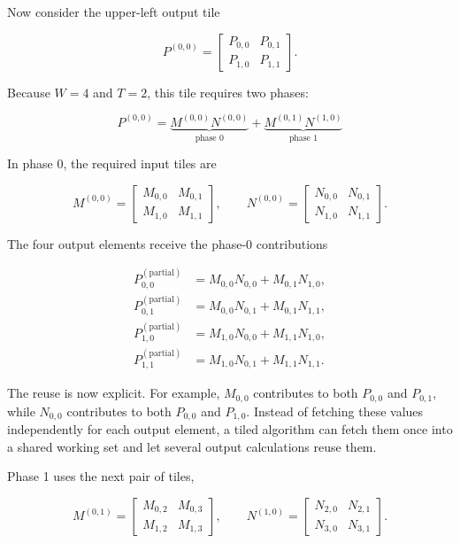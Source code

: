 \documentclass[11pt,a4paper]{article}
\begin{document}
Now consider the upper-left output tile

\[
P^{(0,0)}
=
\begin{bmatrix}
P_{0,0} & P_{0,1} \\
P_{1,0} & P_{1,1}
\end{bmatrix}.
\]

Because $W=4$ and $T=2$, this tile requires two phases:

\[
\boxed{
P^{(0,0)}
=
\underbrace{M^{(0,0)}N^{(0,0)}}_{\text{phase 0}}
+
\underbrace{M^{(0,1)}N^{(1,0)}}_{\text{phase 1}}
}
\]

In phase 0, the required input tiles are

\[
M^{(0,0)}=
\begin{bmatrix}
M_{0,0} & M_{0,1} \\
M_{1,0} & M_{1,1}
\end{bmatrix},
\qquad
N^{(0,0)}=
\begin{bmatrix}
N_{0,0} & N_{0,1} \\
N_{1,0} & N_{1,1}
\end{bmatrix}.
\]

The four output elements receive the phase-0 contributions

\[
\begin{aligned}
P_{0,0}^{(\text{partial})}
&=M_{0,0}N_{0,0}+M_{0,1}N_{1,0},
\\
P_{0,1}^{(\text{partial})}
&=M_{0,0}N_{0,1}+M_{0,1}N_{1,1},
\\
P_{1,0}^{(\text{partial})}
&=M_{1,0}N_{0,0}+M_{1,1}N_{1,0},
\\
P_{1,1}^{(\text{partial})}
&=M_{1,0}N_{0,1}+M_{1,1}N_{1,1}.
\end{aligned}
\]

The reuse is now explicit. For example, $M_{0,0}$ contributes to both $P_{0,0}$ and $P_{0,1}$, while $N_{0,0}$ contributes to both $P_{0,0}$ and $P_{1,0}$. Instead of fetching these values independently for each output element, a tiled algorithm can fetch them once into a shared working set and let several output calculations reuse them.

Phase 1 uses the next pair of tiles,

\[
M^{(0,1)}=
\begin{bmatrix}
M_{0,2} & M_{0,3} \\
M_{1,2} & M_{1,3}
\end{bmatrix},
\qquad
N^{(1,0)}=
\begin{bmatrix}
N_{2,0} & N_{2,1} \\
N_{3,0} & N_{3,1}
\end{bmatrix}.
\]
\end{document}
